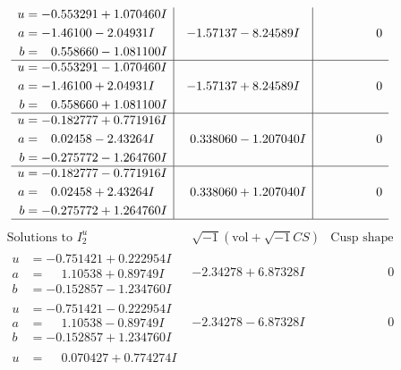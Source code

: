 \documentclass[1p]{elsarticle_modified}
\theoremstyle{definition}
\newcommand{\I}{\sqrt{-1}}
\begin{document}
$$\begin{array}{c|c|c}
\begin{aligned}
u &= -0.553291 + 1.070460 I \\
a &= -1.46100 - 2.04931 I \\
b &= \phantom{-}0.558660 - 1.081100 I\end{aligned}
 & -1.57137 - 8.24589 I & \phantom{-0.000000 } 0 \\ \hline\begin{aligned}
u &= -0.553291 - 1.070460 I \\
a &= -1.46100 + 2.04931 I \\
b &= \phantom{-}0.558660 + 1.081100 I\end{aligned}
 & -1.57137 + 8.24589 I & \phantom{-0.000000 } 0 \\ \hline\begin{aligned}
u &= -0.182777 + 0.771916 I \\
a &= \phantom{-}0.02458 - 2.43264 I \\
b &= -0.275772 - 1.264760 I\end{aligned}
 & \phantom{-}0.338060 - 1.207040 I & \phantom{-0.000000 } 0 \\ \hline\begin{aligned}
u &= -0.182777 - 0.771916 I \\
a &= \phantom{-}0.02458 + 2.43264 I \\
b &= -0.275772 + 1.264760 I\end{aligned}
 & \phantom{-}0.338060 + 1.207040 I & \phantom{-0.000000 } 0\\
 \hline 
 \end{array}$$\newpage$$\begin{array}{c|c|c}  
\text{Solutions to }I^u_{2}& \I (\text{vol} + \sqrt{-1}CS) & \text{Cusp shape}\\
 \hline 
\begin{aligned}
u &= -0.751421 + 0.222954 I \\
a &= \phantom{-}1.10538 + 0.89749 I \\
b &= -0.152857 - 1.234760 I\end{aligned}
 & -2.34278 + 6.87328 I & \phantom{-0.000000 } 0 \\ \hline\begin{aligned}
u &= -0.751421 - 0.222954 I \\
a &= \phantom{-}1.10538 - 0.89749 I \\
b &= -0.152857 + 1.234760 I\end{aligned}
 & -2.34278 - 6.87328 I & \phantom{-0.000000 } 0 \\ \hline\begin{aligned}
u &= \phantom{-}0.070427 + 0.774274 I \\

\end{aligned}
\end{array}$$
\end{document}
